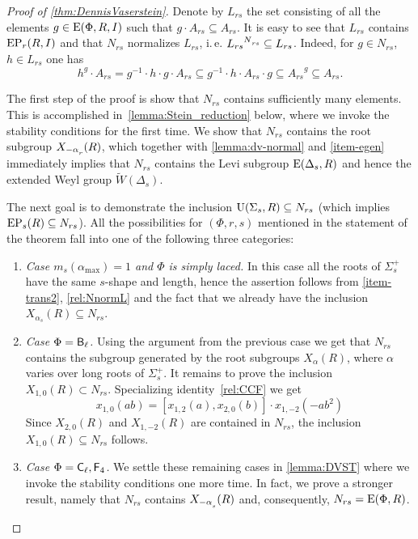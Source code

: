\begin{proof}[Proof of \cref{thm:DennisVaserstein}]
Denote by $L_{rs}$ the set consisting of all the elements $g\in \operatorname{E}(\Phi, R, I)$ such that $g \cdot A_{rs} \subseteq A_{rs}$.
It is easy to see that $L_{rs}$ contains $\operatorname{EP}_r(R, I)$ and that $N_{rs}$ normalizes $L_{rs}$, i.\,e. ${L_{rs}}^{N\ssub{rs}}\subseteq L_{rs}$. Indeed, for $g\in N_{rs}$, $h\in L_{rs}$ one has
\begin{equation}\label{rel:NnormL} h^g \cdot A_{rs} = g^{-1} \cdot h \cdot g \cdot A_{rs} \subseteq g^{-1} \cdot h \cdot A_{rs} \cdot g \subseteq {A_{rs}}^g \subseteq A_{rs}.\end{equation}

The first step of the proof is show that $N_{rs}$ contains sufficiently many elements. 
This is accomplished in~\cref{lemma:Stein_reduction} below, where we invoke the stability conditions for the first time.
We show that $N_{rs}$ contains the root subgroup $X_{-\alpha\ssub{r}}(R)$, which together with \cref{lemma:dv-normal} and \cref{item-egen} immediately implies that $N_{rs}$ contains the Levi subgroup $\operatorname{E}(\Delta_s, R)$ and hence the extended Weyl group $\widetilde{W}(\Delta_s)$.

The next goal is to demonstrate the inclusion $\operatorname{U}(\Sigma_s, R) \subseteq N_{rs}$ (which implies $\operatorname{EP}_s(R) \subseteq N_{rs}$).
All the possibilities for $(\Phi, r, s)$ mentioned in the statement of the theorem fall into one of the following three categories:
\begin{enumerate}
 \item \textit{Case $m_s(\alpha_{\mathrm{max}})=1$ and $\Phi$ is simply laced.}
  In this case all the roots of $\Sigma^+_s$ have the same $s$-shape and length, hence the assertion follows from \cref{item-trans2}, \eqref{rel:NnormL} and the fact that we already have the inclusion $X_{\alpha_s}(R) \subseteq N_{rs}$.
 \item \textit{Case $\Phi = \mathsf{B}_\ell$.} Using the argument from the previous case we get that $N_{rs}$ contains the subgroup generated by the root subgroups $X_\alpha(R)$, where $\alpha$ varies over long roots of $\Sigma_s^+$. 
  It remains to prove the inclusion $X_{1,0}(R) \subset N_{rs}$.
  Specializing identity~\eqref{rel:CCF} we get \begin{equation*} \label{rel:CCF-specBC} x_{1,0}(ab) = [x_{1, 2}(a), x_{2, 0}(b)] \cdot x_{1,-2}(-a b^2) \end{equation*}
  Since $X_{2, 0}(R)$ and $X_{1,-2}(R)$ are contained in $N_{rs}$, the inclusion $X_{1,0}(R) \subseteq N_{rs}$ follows.
 \item \textit{Case $\Phi = \mathsf{C}_\ell, \mathsf{F}_4$.}
 We settle these remaining cases in \cref{lemma:DVST} where we invoke the stability conditions one more time. 
 In fact, we prove a stronger result, namely that $N_{rs}$ contains $X_{-\alpha\ssub{s}}(R)$ and, consequently, $N_{rs} = \operatorname{E}(\Phi, R)$.
\end{enumerate}


\end{proof}
